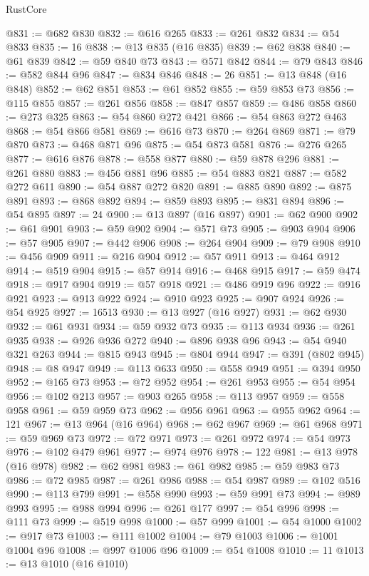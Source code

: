 \begin{lexlean}{RustCore}
\begin{coremodule}
@831 := @682 @830
@832 := @616 @265
@833 := @261 @832
@834 := @54 @833
@835 := 16
@838 := @13 @835 (@16 @835)
@839 := @62 @838
@840 := @61 @839
@842 := @59 @840 @73
@843 := @571 @842
@844 := @79 @843
@846 := @582 @844 @96
@847 := @834 @846
@848 := 26
@851 := @13 @848 (@16 @848)
@852 := @62 @851
@853 := @61 @852
@855 := @59 @853 @73
@856 := @115 @855
@857 := @261 @856
@858 := @847 @857
@859 := @486 @858
@860 := @273 @325
@863 := @54 @860 @272 @421
@866 := @54 @863 @272 @463
@868 := @54 @866 @581
@869 := @616 @73
@870 := @264 @869
@871 := @79 @870
@873 := @468 @871 @96
@875 := @54 @873 @581
@876 := @276 @265
@877 := @616 @876
@878 := @558 @877
@880 := @59 @878 @296
@881 := @261 @880
@883 := @456 @881 @96
@885 := @54 @883 @821
@887 := @582 @272 @611
@890 := @54 @887 @272 @820
@891 := @885 @890
@892 := @875 @891
@893 := @868 @892
@894 := @859 @893
@895 := @831 @894
@896 := @54 @895
@897 := 24
@900 := @13 @897 (@16 @897)
@901 := @62 @900
@902 := @61 @901
@903 := @59 @902
@904 := @571 @73
@905 := @903 @904
@906 := @57 @905
@907 := @442 @906
@908 := @264 @904
@909 := @79 @908
@910 := @456 @909
@911 := @216 @904
@912 := @57 @911
@913 := @464 @912
@914 := @519 @904
@915 := @57 @914
@916 := @468 @915
@917 := @59 @474
@918 := @917 @904
@919 := @57 @918
@921 := @486 @919 @96
@922 := @916 @921
@923 := @913 @922
@924 := @910 @923
@925 := @907 @924
@926 := @54 @925
@927 := 16513
@930 := @13 @927 (@16 @927)
@931 := @62 @930
@932 := @61 @931
@934 := @59 @932 @73
@935 := @113 @934
@936 := @261 @935
@938 := @926 @936 @272
@940 := @896 @938 @96
@943 := @54 @940 @321 @263
@944 := @815 @943
@945 := @804 @944
@947 := @391 (@802 @945)
@948 := @8 @947
@949 := @113 @633
@950 := @558 @949
@951 := @394 @950
@952 := @165 @73
@953 := @72 @952
@954 := @261 @953
@955 := @54 @954
@956 := @102 @213
@957 := @903 @265
@958 := @113 @957
@959 := @558 @958
@961 := @59 @959 @73
@962 := @956 @961
@963 := @955 @962
@964 := 121
@967 := @13 @964 (@16 @964)
@968 := @62 @967
@969 := @61 @968
@971 := @59 @969 @73
@972 := @72 @971
@973 := @261 @972
@974 := @54 @973
@976 := @102 @479 @961
@977 := @974 @976
@978 := 122
@981 := @13 @978 (@16 @978)
@982 := @62 @981
@983 := @61 @982
@985 := @59 @983 @73
@986 := @72 @985
@987 := @261 @986
@988 := @54 @987
@989 := @102 @516
@990 := @113 @799
@991 := @558 @990
@993 := @59 @991 @73
@994 := @989 @993
@995 := @988 @994
@996 := @261 @177
@997 := @54 @996
@998 := @111 @73
@999 := @519 @998
@1000 := @57 @999
@1001 := @54 @1000
@1002 := @917 @73
@1003 := @111 @1002
@1004 := @79 @1003
@1006 := @1001 @1004 @96
@1008 := @997 @1006 @96
@1009 := @54 @1008
@1010 := 11
@1013 := @13 @1010 (@16 @1010)

\end{coremodule}
\end{lexlean}
